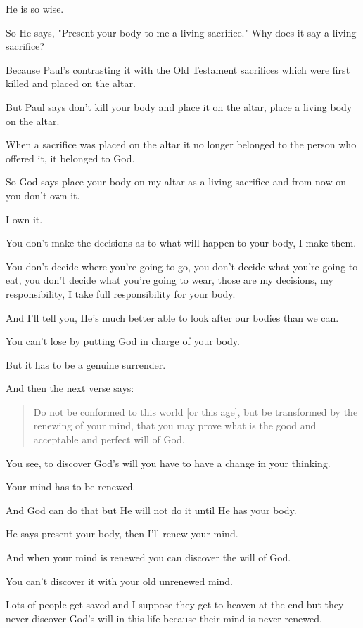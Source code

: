 \documentclass[11pt]{article}
\begin{document}
He is so wise.

So He says, "Present your body to me a living
sacrifice." Why does it say a living
sacrifice?

Because Paul's contrasting it with the Old
Testament sacrifices which were first killed
and placed on the altar.

But Paul says don't kill your body and place
it on the altar, place a living body on the
altar.

When a sacrifice was placed on the altar it no
longer belonged to the person who offered it,
it belonged to God.

So God says place your body on my altar as a
living sacrifice and from now on you don't own
it.

I own it.

You don't make the decisions as to what will
happen to your body, I make them.

You don't decide where you're going to go, you
don't decide what you're going to eat, you
don't decide what you're going to wear, those
are my decisions, my responsibility, I take
full responsibility for your body.

And I'll tell you, He's much better able to
look after our bodies than we can.

You can't lose by putting God in charge of
your body.

But it has to be a genuine surrender.

And then the next verse says:

\begin{quote}
Do not be conformed to this world [or this age], but be
transformed by the renewing of your mind, that
you may prove what is the good and acceptable
and perfect will of God.
\end{quote}

You see, to discover God's will you have to
have a change in your thinking.

Your mind has to be renewed.

And God can do that but He will not do it
until He has your body.

He says present your body, then I'll renew
your mind.

And when your mind is renewed you can discover
the will of God.

You can't discover it with your old unrenewed
mind.

Lots of people get saved and I suppose they
get to heaven at the end but they never
discover God's will in this life because their
mind is never renewed.
\end{document}

